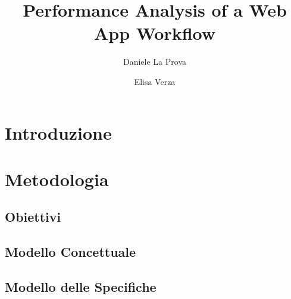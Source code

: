 \documentclass[acmtog]{acmart}
\begin{document}
\title{Performance Analysis of a Web App Workflow}

\author{Daniele La Prova}
\author{Elisa Verza}
\authornotemark[]


\maketitle

\section{Introduzione}



\section{Metodologia}

\subsection{Obiettivi}


\subsection{Modello Concettuale}


\subsection{Modello delle Specifiche}

\end{document}
